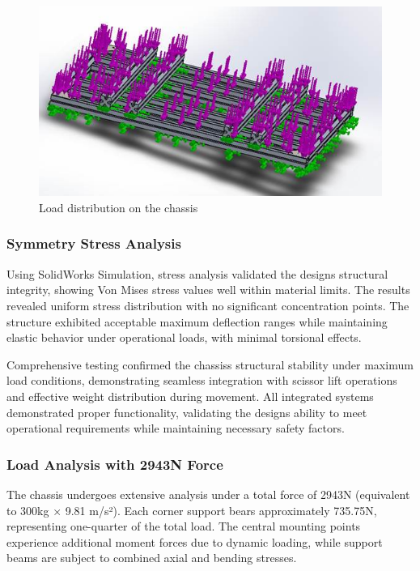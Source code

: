 \documentclass[../../main]{subfiles}
\begin{document}
\begin{figure}[h!]
  \centering
  \includegraphics[width=\textwidth]{img/image122.jpg}
  \caption{Load distribution on the chassis}
  \end{figure}

\subsubsection{Symmetry Stress Analysis}\label{symmetry-stress-analysis}

Using SolidWorks Simulation, stress analysis validated the
design\textquotesingle s structural integrity, showing Von Mises stress
values well within material limits. The results revealed uniform stress
distribution with no significant concentration points. The structure
exhibited acceptable maximum deflection ranges while maintaining elastic
behavior under operational loads, with minimal torsional effects.

Comprehensive testing confirmed the chassis\textquotesingle s structural
stability under maximum load conditions, demonstrating seamless
integration with scissor lift operations and effective weight
distribution during movement. All integrated systems demonstrated proper
functionality, validating the design\textquotesingle s ability to meet
operational requirements while maintaining necessary safety factors.

\subsubsection{Load Analysis with 2943N
Force}\label{load-analysis-with-2943n-force}

The chassis undergoes extensive analysis under a total force of 2943N
(equivalent to 300kg × 9.81 m/s²). Each corner support bears
approximately 735.75N, representing one-quarter of the total load. The
central mounting points experience additional moment forces due to
dynamic loading, while support beams are subject to combined axial and
bending stresses.
\end{document}
